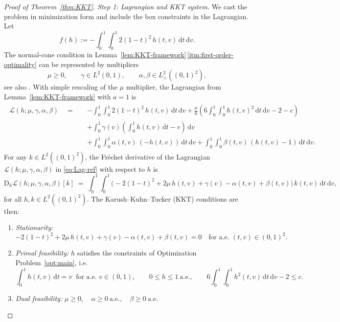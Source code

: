 \documentclass{article}
\newcommand{\1}{\mathds{1}}
\newcommand{\de}{\mathrm{\,d}}
\begin{document}
\begin{proof}[Proof of Theorem~\ref{thm:KKT}]
\emph{Step 1: Lagrangian and KKT system.}
We cast the problem in minimization form and include the box constraints in the Lagrangian.
Let
\[
  f(h):=-\!\!\int_0^1\!\!\int_0^1 2(1-t)^2\,h(t,v)\de t\de v.
\]
The normal-cone condition in Lemma~\ref{lem:KKT-framework}\,\ref{itm:first-order-optimality} can be represented by multipliers
\[
  \mu\ge 0,\qquad \gamma\in L^2(0,1),\qquad \alpha,\beta\in L^2_+((0,1)^2),
\]
see also \cite{rockel2025exact}.
With simple rescaling of the $\mu$ multiplier, the Lagrangian from Lemma~\ref{lem:KKT-framework} with $a=1$ is
\begin{align}\begin{aligned}\label{eq:Lag-ref}
  \mathcal{L}(h;\mu,\gamma,\alpha,\beta)
  \quad=\quad
  &-\!\!\int_0^1\!\!\int_0^1 2(1-t)^2\,h(t,v)\de t\de v
  + \frac{\mu}{6}\!\left(6\!\!\int_0^1\!\!\int_0^1 h(t,v)^2\de t\de v - 2 - c\right) \\
  &+ \int_0^1 \gamma(v)\!\left(\int_0^1 h(t,v)\de t - v\right)\de v \\
  &+ \int_0^1\!\!\int_0^1 \alpha(t,v)\,(-h(t,v))\de t\de v
  + \int_0^1\!\!\int_0^1 \beta(t,v)\,(h(t,v)-1)\de t\de v.
\end{aligned}\end{align}
For any $k\in L^2((0,1)^2)$, the Fréchet derivative of the Lagrangian $\mathcal{L}(h;\mu,\gamma,\alpha,\beta)$ in \eqref{eq:Lag-ref} with respect to $h$ is
\[
  \mathrm{D}_h\mathcal{L}(h;\mu,\gamma,\alpha,\beta)[k]
  \;=\;
  \int_0^1 \int_0^1\big(-2(1-t)^2+2\mu\,h(t,v)+\gamma(v)-\alpha(t,v)+\beta(t,v)\big)\,k(t,v)\de t\de v,
\]
for all $h,k\in L^2((0,1)^2)$.
The Karush–Kuhn–Tucker (KKT) conditions are then:
\begin{enumerate}[label=(\roman*)]
  \item \emph{Stationarity:}
  \begin{equation}\label{eq:stat-ref}
    -2(1-t)^2+2\mu\,h(t,v)+\gamma(v)-\alpha(t,v)+\beta(t,v)=0
    \quad\text{for a.e.~}(t,v)\in(0,1)^2.
  \end{equation}

  \item \emph{Primal feasibility:} $h$ satisfies the constraints of Optimization Problem~\ref{opt:main}, i.e.
  \[
     \int_0^1 h(t,v)\de t=v \ \text{ for a.e.\ }v\in(0,1),\qquad
     0\le h\le 1\ \text{a.e.},\qquad
     6\int_0^1\int_0^1 h^2(t,v)\de t\de v-2\le c.
  \]

  \item \emph{Dual feasibility:}
  \(
     \mu\ge 0,\quad \alpha\ge 0\ \text{a.e.},\quad \beta\ge 0\ \text{a.e.}
  \)


\end{enumerate}
\end{proof}
\end{document}
